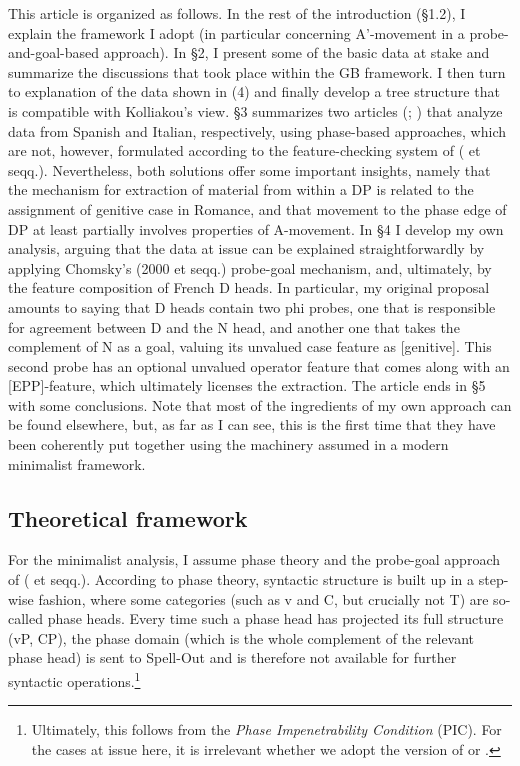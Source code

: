 \documentclass[output=paper]{langsci/langscibook}
\begin{document}
This article is organized as follows. In the rest of the introduction (§1.2), I explain the framework I adopt (in particular concerning A’-movement in a probe-and-goal-based approach). In §2, I present some of the basic data at stake and summarize the discussions that took place within the GB framework. I then turn to  explanation of the data shown in (4) and finally develop a tree structure that is compatible with Kolliakou’s view. §3 summarizes two articles (\citealt{Gutiérrez-Bravo2001}; \citealt{Cinque2014}) that analyze data from Spanish and Italian, respectively, using phase-based approaches, which are not, however, formulated according to the feature-checking system of \citeauthor{Chomsky2000} (\citeyear{Chomsky2000} et seqq.). Nevertheless, both solutions offer some important insights, namely that the mechanism for extraction of material from within a DP is related to the assignment of genitive case in Romance, and that movement to the phase edge of DP at least partially involves properties of A-movement. In §4 I develop my own analysis, arguing that the data at issue can be explained straightforwardly by applying Chomsky’s (2000 et seqq.) probe-goal mechanism, and, ultimately, by the feature composition of French D heads. In particular, my original proposal amounts to saying that D heads contain two phi probes, one that is responsible for agreement between D and the N head, and another one that takes the complement of N as a goal, valuing its unvalued case feature as [genitive]. This second probe has an optional unvalued operator feature that comes along with an [EPP]-feature, which ultimately licenses the extraction. The article ends in §5 with some conclusions. Note that most of the ingredients of my own approach can be found elsewhere, but, as far as I can see, this is the first time that they have been coherently put together using the machinery assumed in a modern minimalist framework.

\subsection{Theoretical framework}%

For the minimalist analysis, I assume phase theory and the probe-goal approach of \citeauthor{Chomsky2000} (\citeyear{Chomsky2000} et seqq.). According to phase theory, syntactic structure is built up in a step-wise fashion, where some categories (such as v and C, but crucially not T) are so-called phase heads. Every time such a phase head has projected its full structure (vP, CP), the phase domain (which is the whole complement of the relevant phase head) is sent to Spell-Out and is therefore not available for further syntactic operations.\footnote{Ultimately, this follows from the \textit{Phase Impenetrability Condition} (PIC). For the cases at issue here, it is irrelevant whether we adopt the version of \citet[108]{Chomsky2000} or \citet[13–14]{Chomsky2001Derivation}.}
\end{document}

